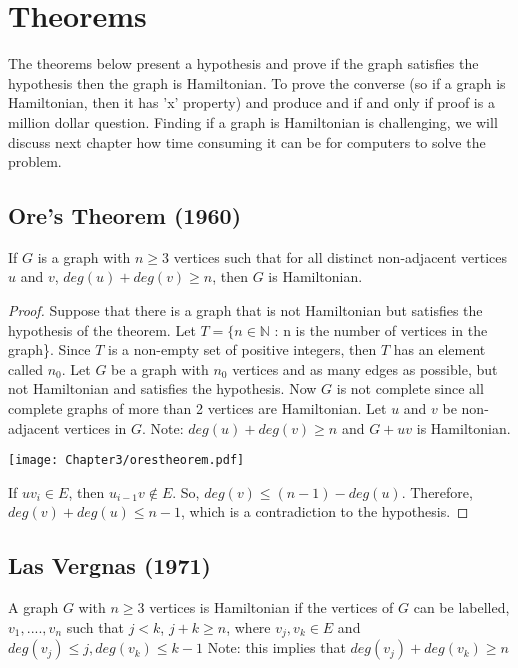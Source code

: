   \newpage

    \section{Theorems}
  The theorems below present a hypothesis and prove if the graph satisfies the hypothesis then the graph is Hamiltonian. To prove the converse (so if a graph is Hamiltonian, then it has 'x' property) and produce and if and only if proof is a million dollar question. Finding if a graph is Hamiltonian is challenging, we will discuss next chapter how time consuming it can be for computers to solve the problem. 
    \subsection{Ore's Theorem (1960)}
  If $G$ is a graph with $n \geq 3$ vertices such that for all distinct non-adjacent vertices $u$ and $v$, $deg(u) + deg(v) \geq n$, then $G$ is Hamiltonian.
    \begin{proof}
	    Suppose that there is a graph that is not Hamiltonian but satisfies the hypothesis of the theorem. Let $T = \{n \in \mathbb{N} $ : n is the number of vertices in the graph\}. Since $T$ is a non-empty set of positive integers, then $T$ has an element called $n_{0}$. Let $G$ be a graph with $n_{0}$ vertices and as many edges as possible, but not Hamiltonian and satisfies the hypothesis. Now $G$ is not complete since all complete graphs of more than 2 vertices are Hamiltonian. Let $u$ and $v$ be non-adjacent vertices in $G$. Note: $deg(u) + deg(v) \geq n$ and $G + uv$ is Hamiltonian. 
  \begin{center}
  	\texttt{[image: Chapter3/orestheorem.pdf]}
  \end{center}
    
    
    If $uv_{i} \in E$, then $u_{i-1}v \notin E$. So, $deg(v) \leq (n-1) - deg(u)$. Therefore, $deg(v) + deg(u) \leq n - 1$, which is a contradiction to the hypothesis.\cite{Ore'sTheorem}
    \end{proof}
  \subsection{Las Vergnas (1971)}
  A graph $G$ with $n \geq 3$ vertices is Hamiltonian if the vertices of $G$ can be labelled, $v_{1}, .... ,v_{n}$ such that $j < k$, $j + k \geq n$, where $v_{j}, v_{k} \in E$ and $deg(v_{j}) \leq j, deg(v_{k}) \leq k - 1$ Note: this implies that $deg(v_{j}) + deg(v_{k}) \geq n$
